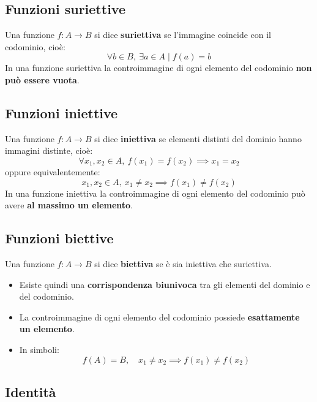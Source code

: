 \documentclass[oneside,10pt]{book} %
\begin{document}

\subsection{Funzioni suriettive}
Una funzione $f: A \to B$ si dice \textbf{suriettiva} se l'immagine coincide con il codominio, cioè:
\[
\forall b \in B, \ \exists a \in A \mid f(a) = b
\]
In una funzione suriettiva la controimmagine di ogni elemento del codominio \textbf{non può essere vuota}.

\subsection{Funzioni iniettive}
Una funzione $f: A \to B$ si dice \textbf{iniettiva} se elementi distinti del dominio hanno immagini distinte, cioè:
\[
\forall x_1, x_2 \in A, \ f(x_1) = f(x_2) \implies x_1 = x_2
\]
oppure equivalentemente:
\[
x_1, x_2 \in A, \ x_1 \ne x_2 \implies f(x_1) \ne f(x_2)
\]
In una funzione iniettiva la controimmagine di ogni elemento del codominio può avere \textbf{al massimo un elemento}.

\subsection{Funzioni biettive}
Una funzione $f: A \to B$ si dice \textbf{biettiva} se è sia iniettiva che suriettiva.
\begin{itemize}
    \item Esiste quindi una \textbf{corrispondenza biunivoca} tra gli elementi del dominio e del codominio.
    \item La controimmagine di ogni elemento del codominio possiede \textbf{esattamente un elemento}.
    \item In simboli:
    \[
    f(A) = B, \quad x_1 \ne x_2 \implies f(x_1) \ne f(x_2)
    \]
\end{itemize}

\subsection{Identità}
\end{document}

